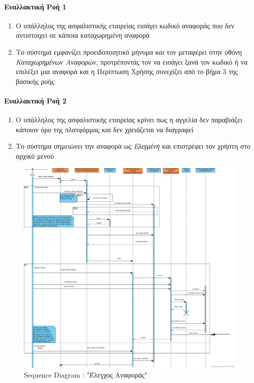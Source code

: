 \documentclass{../ol-softwaremanual}
\begin{document}
	\paragraph{Εναλλακτική Ροή 1}
	\begin{enumerate}
		\item Ο υπάλληλος της ασφαλιστικής εταιρείας εισάγει κωδικό αναφοράς που δεν αντιστοιχεί σε κάποια καταχωρημένη αναφορά
		\item Το σύστημα εμφανίζει προειδοποιητικό μήνυμα και τον μεταφέρει στην οθόνη \textit{Καταχωρημένων Αναφορών}, προτρέποντάς τον να εισάγει ξανά τον κωδικό ή να επιλέξει μια αναφορά και η Περίπτωση Χρήσης συνεχίζει από το βήμα 3 της βασικής ροής
	\end{enumerate}	
	
	\paragraph{Εναλλακτική Ροή 2}
	\begin{enumerate}
		\item Ο υπάλληλος της ασφαλιστικής εταιρείας κρίνει πως η αγγελία δεν παραβιάζει κάποιον όρο της πλατφόρμας και δεν χρειάζεται να διαγραφεί
		\item Το σύστημα σημειώνει την αναφορά ως \textit{Ελεγμένη}	και επιστρέφει τον χρήστη στο αρχικό μενού
	\end{enumerate}
	
	\newpage
	
	\begin{figure}[htbp!]
		\centering
		\includegraphics[scale=0.285]{img/seq_check_report.png}
		\caption{\en Sequence Diagram : "\gr Έλεγχος Αναφοράς\en"\gr\protect\footnotemark[7]}
	\end{figure}
	
\end{document}
